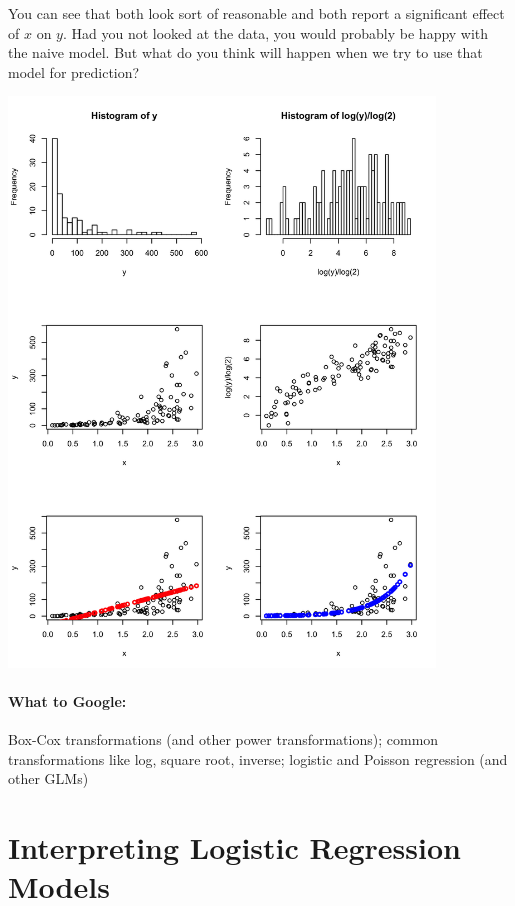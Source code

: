 You can see that both look sort of reasonable and both report a significant effect of $x$ on $y$. Had you not looked at the data, you would probably be happy with the naive model. But what do you think will happen when we try to use that model for prediction?

\begin{center}
\includegraphics[width=0.85\textwidth]{img/transform-simulation-example.png}
\end{center}

\paragraph{What to Google:} Box-Cox transformations (and other power transformations); common transformations like log, square root, inverse; logistic and Poisson regression (and other GLMs)


\section{Interpreting Logistic Regression Models}

